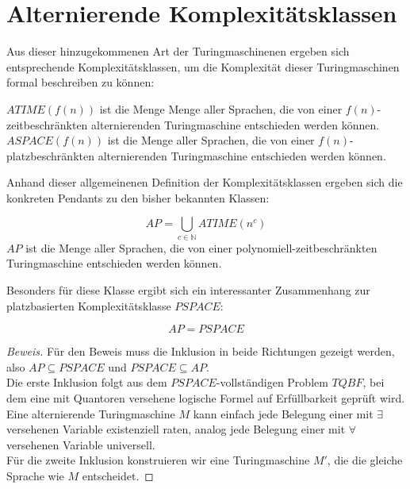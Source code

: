 \section{Alternierende Komplexitätsklassen} \label{section: Komplexitätsklassen bei alternierenden TMs}
Aus dieser hinzugekommenen Art der Turingmaschinenen ergeben sich entsprechende Komplexitätsklassen,
um die Komplexität dieser Turingmaschinen formal beschreiben zu können:
\begin{definition}
    $ATIME(f(n))$ ist die Menge Menge aller Sprachen, die von einer $f(n)$-zeitbeschränkten alternierenden Turingmaschine entschieden werden können. \\
    $ASPACE(f(n))$ ist die Menge aller Sprachen, die von einer $f(n)$-platzbeschränkten alternierenden Turingmaschine entschieden werden können.
\end{definition}
Anhand dieser allgemeinenen Definition der Komplexitätsklassen ergeben sich die konkreten Pendants zu den bisher bekannten Klassen:
\begin{definition}
    $$AP = \bigcup_{c \in \mathbb{N}} ATIME(n^c)$$
    $AP$ ist die Menge aller Sprachen, die von einer polynomiell-zeitbeschränkten Turingmaschine entschieden werden können.
\end{definition}
Besonders für diese Klasse ergibt sich ein interessanter Zusammenhang zur platzbasierten Komplexitätsklasse $PSPACE$:

\begin{theorem}
    $$AP = PSPACE$$
\end{theorem}

\begin{proof}[Beweis]
    Für den Beweis muss die Inklusion in beide Richtungen gezeigt werden, also $AP \subseteq PSPACE$ und $PSPACE \subseteq AP$. \\
    Die erste Inklusion folgt aus dem $PSPACE$-vollständigen Problem $TQBF$, bei dem eine mit Quantoren versehene logische Formel auf Erfüllbarkeit geprüft wird.
    Eine alternierende Turingmaschine $M$ kann einfach jede Belegung einer mit $\exists$ versehenen Variable existenziell raten, analog jede Belegung einer mit $\forall$ 
    versehenen Variable universell.\\
    Für die zweite Inklusion konstruieren wir eine Turingmaschine $M'$, die die gleiche Sprache wie $M$ entscheidet.
\end{proof}